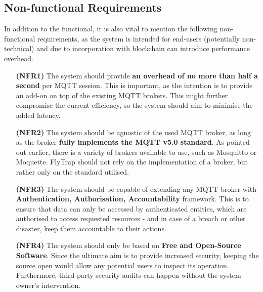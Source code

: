\subsection{Non-functional Requirements}

In addition to the functional, it is also vital to mention the following non-functional requirements, as the system is intended for end-users (potentially non-technical) and due to incorporation with blockchain can introduce performance overhead.

\begin{itemize}[leftmargin=4.5em]
\item[\textbf{(NFR1)}] The system should provide \textbf{an overhead of no more than half a second} per MQTT session. This is important, as the intention is to provide an add-on on top of the existing MQTT brokers. This might further compromise the current efficiency, so the system should aim to minimise the added latency. 
\item[\textbf{(NFR2)}] The system should be agnostic of the used MQTT broker, as long as the broker \textbf{fully implements the MQTT v5.0 standard}. As pointed out earlier, there is a variety of brokers available to use, such as Mosquitto or Moquette. FlyTrap should not rely on the implementation of a broker, but rather only on the standard utilised.
\item[\textbf{(NFR3)}] The system should be capable of extending any MQTT broker with \textbf{Authentication, Authorisation, Accountability} framework. This is to ensure that data can only be accessed by authenticated entities, which are authorised to access requested resources - and in case of a breach or other disaster, keep them accountable to their actions.
\item[\textbf{(NFR4)}] The system should only be based on \textbf{Free and Open-Source Software}. Since the ultimate aim is to provide increased security, keeping the source open would allow any potential users to inspect its operation. Furthermore, third party security audits can happen without the system owner's intervention.
\end{itemize}


